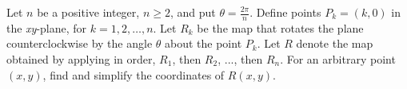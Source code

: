 Let $n$ be a positive integer, $n \ge 2$, and put $\theta=\frac{2\pi}{n}$. Define points $P_k=(k,0)$ in the \textit{xy}-plane, for $k=1,2,\dots,n$. Let $R_k$ be the map that rotates the plane counterclockwise by the angle $\theta$ about the point $P_k$. Let $R$ denote the map obtained by applying in order, $R_1$, then $R_2$, ..., then $R_n$. For an arbitrary point $(x,y)$, find and simplify the coordinates of $R(x,y)$.